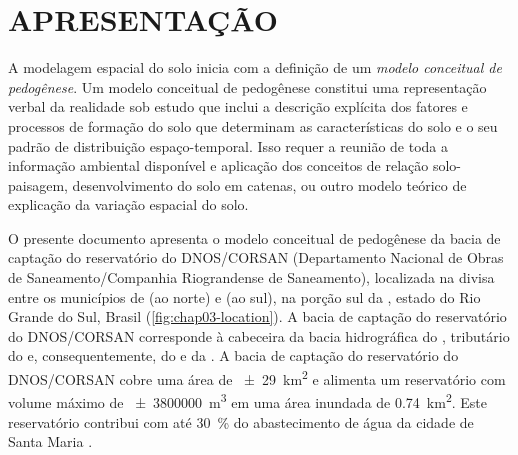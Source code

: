 \formatchapter

\section{APRESENTAÇÃO}
\label{sec:chap03-apresentacao}


A modelagem espacial do solo inicia com a definição de um \emph{modelo conceitual de pedogênese}. Um modelo 
conceitual de pedogênese constitui uma representação verbal da realidade sob estudo que inclui a descrição 
explícita dos fatores e processos de formação do solo que determinam as características do solo e o seu padrão 
de distribuição espaço-temporal. Isso requer a reunião de toda a informação ambiental disponível e aplicação 
dos conceitos de relação solo-paisagem, desenvolvimento do solo em catenas, ou outro modelo teórico de 
explicação da variação espacial do solo.

O presente documento apresenta o modelo conceitual de pedogênese da bacia de captação do reservatório do 
DNOS/CORSAN (Departamento Nacional de Obras de Saneamento/Companhia Riograndense de Saneamento), localizada na 
divisa entre os municípios de \itaara{} (ao norte) e \santamaria{} (ao sul), na porção sul da \baciaparana{},
estado do Rio Grande do Sul, Brasil (\autoref{fig:chap03-location}). A bacia de captação do reservatório do 
DNOS/CORSAN corresponde à cabeceira da bacia hidrográfica do \riovacacaimirim{}, tributário do \riojacui{} e, 
consequentemente, do \rioguaiba{} e da \lagoadospatos{}. A bacia de captação do reservatório do DNOS/CORSAN
cobre uma área de \SI{\pm29}{\square\kilo\metre} e alimenta um reservatório com volume máximo 
de \SI{\pm3800000}{\cubic\metre} em uma área inundada de \SI{0,74}{\square\kilo\metre}. Este reservatório 
contribui com até \SI{30}{\percent} do abastecimento de água da cidade de Santa Maria \cite{Dias2003, 
DillEtAl2004, Miguel2010}.

